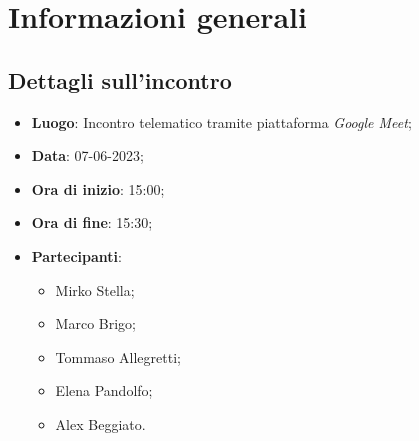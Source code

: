 \section{Informazioni generali}

\subsection{Dettagli sull'incontro}
\begin{itemize}
\item \textbf{Luogo}: Incontro telematico tramite piattaforma \textit{Google Meet};
\item \textbf{Data}: 07-06-2023;
\item \textbf{Ora di inizio}: 15:00;
\item \textbf{Ora di fine}: 15:30;
\item \textbf{Partecipanti}: 
\begin{itemize}
	\item Mirko Stella;
	\item Marco Brigo;
	\item Tommaso Allegretti;
	\item Elena Pandolfo;
	\item Alex Beggiato.
\end{itemize}
\end{itemize}
